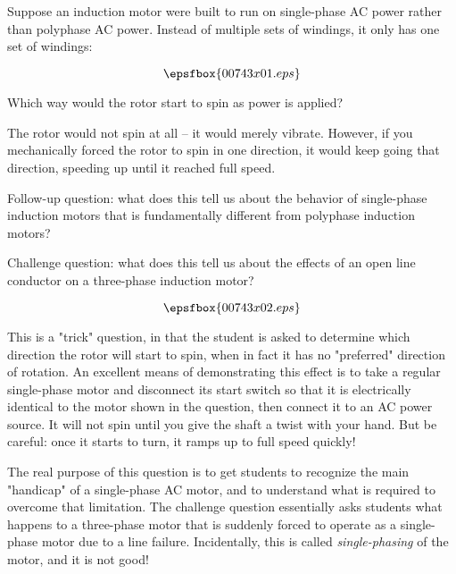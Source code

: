 

Suppose an induction motor were built to run on single-phase AC power rather than polyphase AC power.  Instead of multiple sets of windings, it only has one set of windings:

$$\epsfbox{00743x01.eps}$$

Which way would the rotor start to spin as power is applied?







The rotor would not spin at all -- it would merely vibrate.  However, if you mechanically forced the rotor to spin in one direction, it would keep going that direction, speeding up until it reached full speed.

\vskip 10pt

Follow-up question: what does this tell us about the behavior of single-phase induction motors that is fundamentally different from polyphase induction motors?

\vskip 10pt

Challenge question: what does this tell us about the effects of an open line conductor on a three-phase induction motor?

$$\epsfbox{00743x02.eps}$$







This is a "trick" question, in that the student is asked to determine which direction the rotor will start to spin, when in fact it has no "preferred" direction of rotation.  An excellent means of demonstrating this effect is to take a regular single-phase motor and disconnect its start switch so that it is electrically identical to the motor shown in the question, then connect it to an AC power source.  It will not spin until you give the shaft a twist with your hand.  But be careful: once it starts to turn, it ramps up to full speed quickly!

The real purpose of this question is to get students to recognize the main "handicap" of a single-phase AC motor, and to understand what is required to overcome that limitation.  The challenge question essentially asks students what happens to a three-phase motor that is suddenly forced to operate as a single-phase motor due to a line failure.  Incidentally, this is called {\it single-phasing} of the motor, and it is not good!




